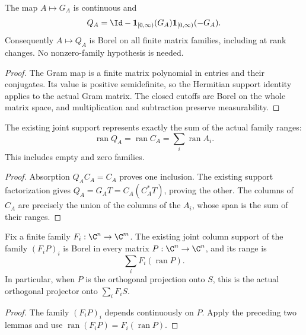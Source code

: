 \begin{lemma}
    \label{lem:borel_family_column_support}
    \leanok
    The map $A\mapsto G_A$ is continuous and
    \[
        Q_A=\Id-\mathbf1_{[0,\infty)}(G_A)
                    \mathbf1_{[0,\infty)}(-G_A).
    \]
    Consequently $A\mapsto Q_A$ is Borel on all finite matrix families,
    including at rank changes. No nonzero-family hypothesis is needed.
\end{lemma}
\begin{proof}\leanok
    The Gram map is a finite matrix polynomial in entries and their
    conjugates. Its value is positive semidefinite, so the Hermitian
    support identity applies to the actual Gram matrix. The closed cutoffs
    are Borel on the whole matrix space, and multiplication and subtraction
    preserve measurability.
\end{proof}

\begin{lemma}
    \label{lem:family_column_support_range}
    \leanok
    The existing joint support represents exactly the sum of the actual
    family ranges:
    \[
        \operatorname{ran}Q_A=\operatorname{ran}C_A
             =\sum_i\operatorname{ran}A_i.
    \]
    This includes empty and zero families.
\end{lemma}
\begin{proof}\leanok
    Absorption $Q_AC_A=C_A$ proves one inclusion. The existing support
    factorization gives $Q_A=G_AT=C_A(C_A^*T)$, proving the other.
    The columns of $C_A$ are precisely the union of the columns of the
    $A_i$, whose span is the sum of their ranges.
\end{proof}

\begin{lemma}
    \label{lem:borel_finite_operator_image_support}
    \leanok
    Fix a finite family $F_i:\C^n\to\C^m$. The existing joint column
    support of the family $(F_iP)_i$ is Borel in every matrix
    $P:\C^n\to\C^n$, and its range is
    \[
        \sum_i F_i(\operatorname{ran}P).
    \]
    In particular, when $P$ is the orthogonal projection onto $S$, this
    is the actual orthogonal projector onto $\sum_iF_iS$.
\end{lemma}
\begin{proof}\leanok
    The family $(F_iP)_i$ depends continuously on $P$. Apply the preceding
    two lemmas and use $\operatorname{ran}(F_iP)=F_i(\operatorname{ran}P)$.
\end{proof}

